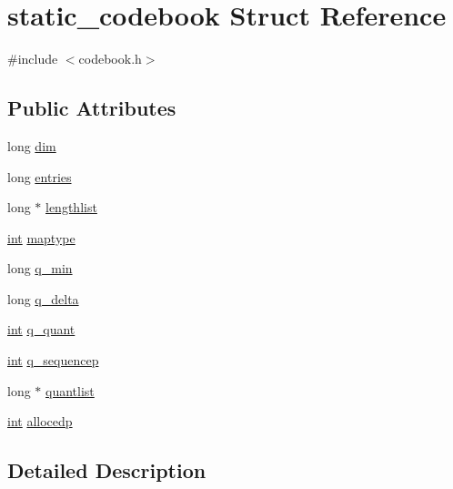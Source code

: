 \hypertarget{structstatic__codebook}{}\section{static\+\_\+codebook Struct Reference}
\label{structstatic__codebook}


{\ttfamily \#include $<$codebook.\+h$>$}

\subsection*{Public Attributes}
\begin{DoxyCompactItemize}
\item 
long \hyperlink{structstatic__codebook_ad054a29cfda0a663e6c20c880a247300}{dim}
\item 
long \hyperlink{structstatic__codebook_af672cb700b32f865aa6b3a8807e6bcaf}{entries}
\item 
long $\ast$ \hyperlink{structstatic__codebook_a21d2a561788023117e66d178fd41801b}{lengthlist}
\item 
\hyperlink{xmltok_8h_a5a0d4a5641ce434f1d23533f2b2e6653}{int} \hyperlink{structstatic__codebook_a818d20b21c9c6c1d9472a09c4b063794}{maptype}
\item 
long \hyperlink{structstatic__codebook_a8f11e73cd9db46a04fb86743f078a27c}{q\+\_\+min}
\item 
long \hyperlink{structstatic__codebook_a94d93723dc380cd4fe483094e133ecb4}{q\+\_\+delta}
\item 
\hyperlink{xmltok_8h_a5a0d4a5641ce434f1d23533f2b2e6653}{int} \hyperlink{structstatic__codebook_aaf7234dd01a51b7a70e3ab06122ee7ca}{q\+\_\+quant}
\item 
\hyperlink{xmltok_8h_a5a0d4a5641ce434f1d23533f2b2e6653}{int} \hyperlink{structstatic__codebook_aae1321f5435c0b33f22beb66636aa3b2}{q\+\_\+sequencep}
\item 
long $\ast$ \hyperlink{structstatic__codebook_ae21b02047f7e9fb30a72ad1c41c92426}{quantlist}
\item 
\hyperlink{xmltok_8h_a5a0d4a5641ce434f1d23533f2b2e6653}{int} \hyperlink{structstatic__codebook_a9992fc79beaacce326a6b6cc4b7f0ef9}{allocedp}
\end{DoxyCompactItemize}


\subsection{Detailed Description}


